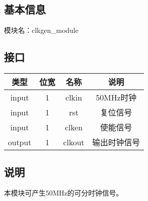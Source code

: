 \subsection{基本信息}
模块名：clkgen\_module
\subsection{接口}
\begin{tabular}{|c|c|c|c|}
    \hline
    类型    &   位宽    &   名称    &   说明\\\hline
    input   &   1   &   clkin &   50MHz时钟\\\hline
    input   &   1   &   rst  &   复位信号\\\hline
    input   &   1   &   clken  &   使能信号\\\hline
    output   &   1   &   clkout  &   输出时钟信号\\\hline
\end{tabular}
\subsection{说明}
本模块可产生50MHz的可分时钟信号。\\